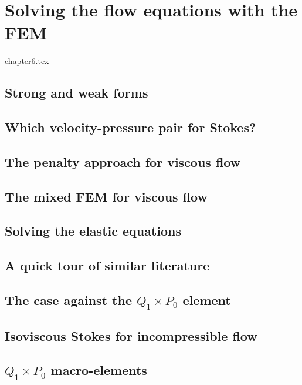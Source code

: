 \chapter{Solving the flow equations with the FEM} \label{solvingFEM} %

\begin{flushright} {\tiny {\color{gray} chapter6.tex}} \end{flushright}

\section{Strong and weak forms}  %
\section{Which velocity-pressure pair for Stokes?}\label{ss:pair} %

\newpage
\section{The penalty approach for viscous flow}\label{sec:penalty} %
\newpage
\section{The mixed FEM for viscous flow} \label{sec:mixed}  %
\newpage
\section{Solving the elastic equations}  %
\section{A quick tour of similar literature}  %
\section{The case against the $Q_1\times P_0$ element}  %
\section{Isoviscous Stokes for incompressible flow}\label{ss:isovisc} 
\section{$Q_1\times P_0$ macro-elements} \label{ss:meshtopos}  %
